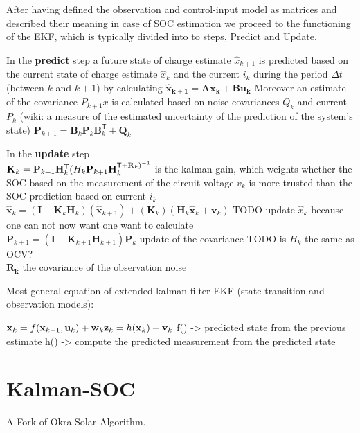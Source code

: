 After having defined the observation and control-input model as matrices and described their meaning in case of SOC estimation we proceed to the functioning of the EKF, which is typically divided into to steps, Predict and Update. 

In the \textbf{predict} step a future state of charge estimate  $\hat x_{k+1}$ is predicted based on the current state of charge estimate $\hat x_k$ and the current $i_k$ during the period $\Delta t$ (between $k$ and $k+1$) by calculating $ \mathbf{\hat x_{k+1}=Ax_{k}+Bu_{k}} $ Moreover an estimate of the covariance $P_{k+1}x$ is calculated based on noise covariances $Q_k$ and current $P_k$ (wiki: a measure of the estimated uncertainty of the prediction of the system's state)  $\mathbf {P} _{k+1}=\mathbf {B} _{k}\mathbf {P} _{k}\mathbf {B} _{k}^{\textsf {T}}+\mathbf {Q} _{k} $

In the \textbf{update} step  \\
$ \mathbf {K} _{k}=\mathbf {P} _{k+1}\mathbf {H} _{k}^ \textsf {T} (  \mathbf \mathbf {H} _{k}\mathbf {P} _{k+1}\mathbf {H} _{k}^{\textsf {T}+\mathbf {R} _{k})^{-1}}$  is the kalman gain, which weights whether the SOC based on the measurement of the circuit voltage $v_k$ is more trusted than the SOC prediction based on current $i_k$ \\
$ {\hat {\mathbf {x} }}_{k}=(\mathbf {I} -\mathbf {K} _{k}\mathbf {H} _{k})({\hat {\mathbf {x} }}_{k+1})+(\mathbf {K} _{k})(\mathbf {H} _{k}\mathbf {\hat x} _{k}+\mathbf {v} _{k}) $ TODO update $\hat x_k$ because one can not now want one want to calculate\\  

$ \mathbf {P} _{k+1}=\left(\mathbf {I} -\mathbf {K} _{k+1}\mathbf {H} _{k+1}\right)\mathbf {P} _{k} $ update of the covariance TODO is $H_{k}$ the same as OCV? \\

$\mathbf{R_k}$ the covariance of the observation noise 

Most general equation of extended kalman filter EKF (state transition and observation models): 

$ \mathbf {x}_{k}=f(\mathbf {x} _{k-1},\mathbf {u}_{k})+\mathbf {w}_{k}\\\mathbf {z}_{k}=h(\mathbf {x} _{k})+\mathbf {v}_{k}$
f() ->  predicted state from the previous estimate
h() ->  compute the predicted measurement from the predicted state
\section{Kalman-SOC}
A Fork of Okra-Solar Algorithm. \

